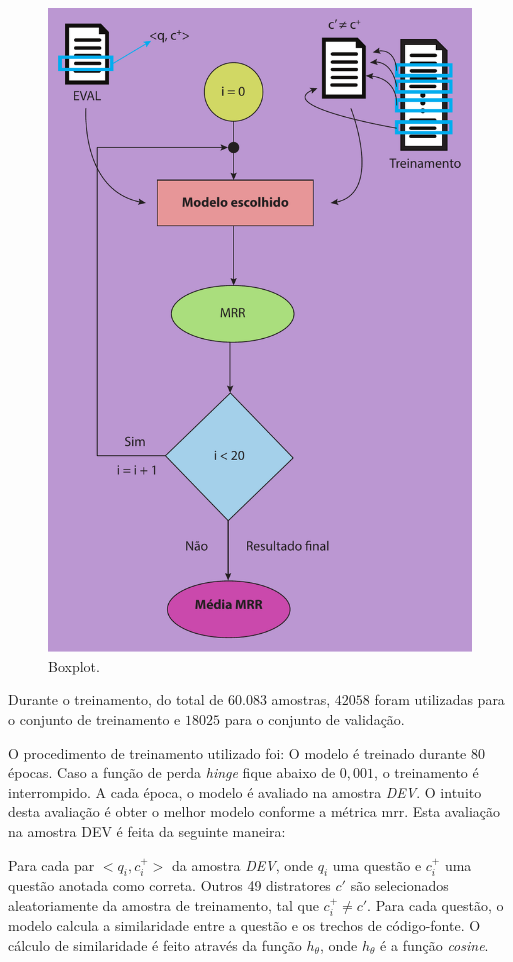 \begin{figure}[h]
\centering
\includegraphics[height=1\textwidth]{figuras/cap-experimento/final_evaluation_process.pdf}
\caption{Boxplot.} 
\label{fig:final-evaluation-process}
\end{figure}


Durante o treinamento, do total de $60.083$ amostras, $42058$ foram utilizadas para o conjunto de treinamento e $18025$ para o conjunto de validação.

O procedimento de treinamento utilizado foi: O modelo é treinado durante 80 épocas. Caso a função de perda \textit{hinge} fique abaixo de $0,001$, o treinamento é interrompido. A cada época, o modelo é avaliado na amostra \emph{DEV}. O intuito desta avaliação é obter o melhor modelo conforme a métrica \acrshort{mrr}. Esta avaliação na amostra DEV é feita da seguinte maneira:

Para cada par $<q_{i}, c_{i}^{+}>$ da amostra \emph{DEV}, onde $q_{i}$ uma questão e $c_{i}^{+}$ uma questão anotada como correta. Outros 49 distratores $c'$ são selecionados aleatoriamente da amostra de treinamento, tal que $c_{i}^{+} \neq c'$. Para cada questão, o modelo calcula a similaridade entre a questão e os trechos de código-fonte. O cálculo de similaridade é feito através da função $h_{\theta}$, onde $h_{\theta}$ é a função \textit{cosine}. 

